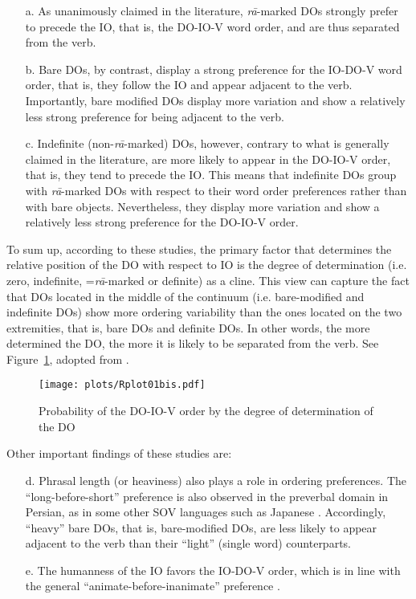 \documentclass[output=paper]{langsci/langscibook}
\begin{document}
\begin{itemize}
	
	\item[a.] As unanimously claimed in the literature, \textit{r\=a}-marked DOs strongly prefer to precede the IO, that is, the DO-IO-V word order, and are thus separated from the verb.
	
	\item[b.] Bare DOs, by contrast, display a strong preference for the IO-DO-V word order, that is, they follow the IO and appear adjacent to the verb. Importantly, bare modified DOs display more variation and show a relatively less strong preference for being adjacent to the verb.
	
	\item[c.] Indefinite (non-\textit{r\=a}-marked) DOs, however, contrary to what is generally claimed in the literature, are more likely to appear in the DO-IO-V order, that is, they tend to precede the IO. This means that indefinite DOs group with \textit{r\=a}-marked DOs with respect to their word order preferences rather than with bare objects. Nevertheless, they display more variation and show a relatively less strong preference for the DO-IO-V order.
	
\end{itemize}


To sum up, according to these studies, the primary factor that determines the relative position of the DO with respect to IO is the degree of determination (i.e. zero, indefinite, =\textit{r\=a}-marked or definite) as a cline.  This view can capture the fact that DOs located in the middle of the continuum (i.e. bare-modified and indefinite DOs) show more ordering variability than the ones located on the two extremities, that is, bare DOs and definite DOs. In other words, the more determined the DO, the more it is likely to be separated from the verb. See Figure~\ref{Cline}, adopted from \citet[196]{FaghiriPhd}.


\begin{figure}
	\texttt{[image: plots/Rplot01bis.pdf]}
	\caption{Probability of the DO-IO-V order by the degree of determination of the DO}\label{Cline}
\end{figure}

Other important findings of these studies are:

\begin{itemize}\label{ListWOClaims}
	\item[d.]  Phrasal length (or heaviness) also plays a role in ordering preferences. The ``long-before-short'' preference is also observed in the preverbal domain in Persian, as in some other SOV languages such as Japanese \citep{hawkins94,yamashita2001}. Accordingly, ``heavy'' bare DOs, that is, bare-modified DOs, are less likely to appear adjacent to the verb than their ``light'' (single word) counterparts.
	\item[e.] The humanness of the IO favors the IO-DO-V order, which is in line with the general  ``animate-before-inanimate'' preference \citep{bresnan07,branigan1999conceptual,collins1995indirect,Hoberg81a,kempen2004corpus,Rosenbach2002}.
\end{itemize}
\end{document}
